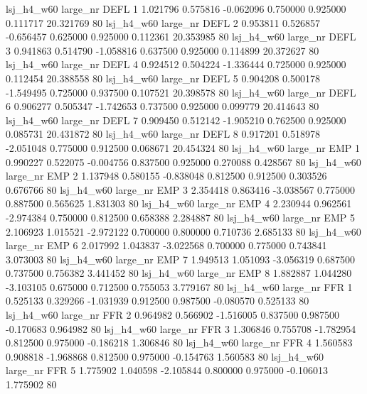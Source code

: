   lsj_h4_w60   large_nr     DEFL                 1  1.021796  0.575816  -0.062096 0.750000 0.925000  0.111717   20.321769 80
  lsj_h4_w60   large_nr     DEFL                 2  0.953811  0.526857  -0.656457 0.625000 0.925000  0.112361   20.353985 80
  lsj_h4_w60   large_nr     DEFL                 3  0.941863  0.514790  -1.058816 0.637500 0.925000  0.114899   20.372627 80
  lsj_h4_w60   large_nr     DEFL                 4  0.924512  0.504224  -1.336444 0.725000 0.925000  0.112454   20.388558 80
  lsj_h4_w60   large_nr     DEFL                 5  0.904208  0.500178  -1.549495 0.725000 0.937500  0.107521   20.398578 80
  lsj_h4_w60   large_nr     DEFL                 6  0.906277  0.505347  -1.742653 0.737500 0.925000  0.099779   20.414643 80
  lsj_h4_w60   large_nr     DEFL                 7  0.909450  0.512142  -1.905210 0.762500 0.925000  0.085731   20.431872 80
  lsj_h4_w60   large_nr     DEFL                 8  0.917201  0.518978  -2.051048 0.775000 0.912500  0.068671   20.454324 80
  lsj_h4_w60   large_nr      EMP                 1  0.990227  0.522075  -0.004756 0.837500 0.925000  0.270088    0.428567 80
  lsj_h4_w60   large_nr      EMP                 2  1.137948  0.580155  -0.838048 0.812500 0.912500  0.303526    0.676766 80
  lsj_h4_w60   large_nr      EMP                 3  2.354418  0.863416  -3.038567 0.775000 0.887500  0.565625    1.831303 80
  lsj_h4_w60   large_nr      EMP                 4  2.230944  0.962561  -2.974384 0.750000 0.812500  0.658388    2.284887 80
  lsj_h4_w60   large_nr      EMP                 5  2.106923  1.015521  -2.972122 0.700000 0.800000  0.710736    2.685133 80
  lsj_h4_w60   large_nr      EMP                 6  2.017992  1.043837  -3.022568 0.700000 0.775000  0.743841    3.073003 80
  lsj_h4_w60   large_nr      EMP                 7  1.949513  1.051093  -3.056319 0.687500 0.737500  0.756382    3.441452 80
  lsj_h4_w60   large_nr      EMP                 8  1.882887  1.044280  -3.103105 0.675000 0.712500  0.755053    3.779167 80
  lsj_h4_w60   large_nr      FFR                 1  0.525133  0.329266  -1.031939 0.912500 0.987500 -0.080570    0.525133 80
  lsj_h4_w60   large_nr      FFR                 2  0.964982  0.566902  -1.516005 0.837500 0.987500 -0.170683    0.964982 80
  lsj_h4_w60   large_nr      FFR                 3  1.306846  0.755708  -1.782954 0.812500 0.975000 -0.186218    1.306846 80
  lsj_h4_w60   large_nr      FFR                 4  1.560583  0.908818  -1.968868 0.812500 0.975000 -0.154763    1.560583 80
  lsj_h4_w60   large_nr      FFR                 5  1.775902  1.040598  -2.105844 0.800000 0.975000 -0.106013    1.775902 80
